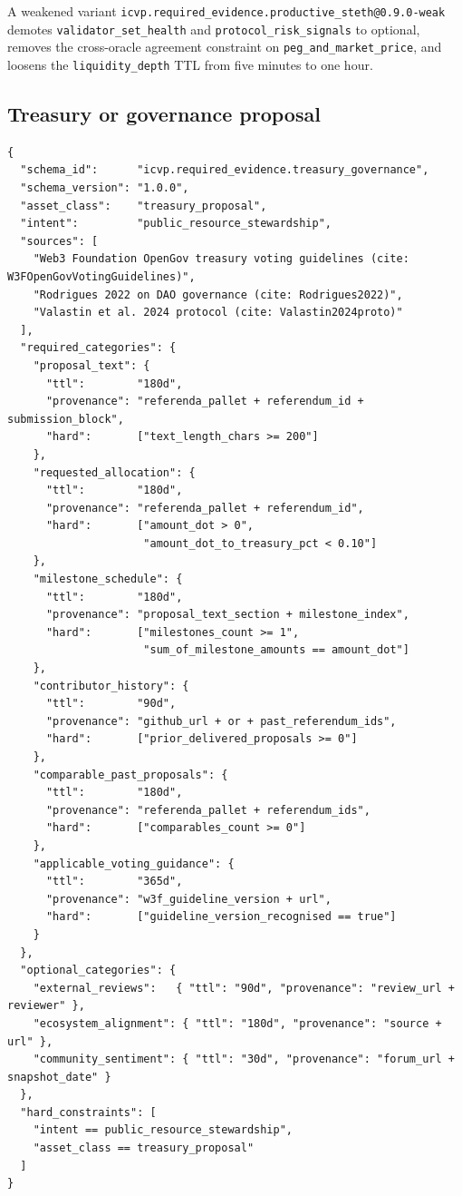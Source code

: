A weakened variant \texttt{icvp.required\_evidence.productive\_steth@0.9.0-weak} demotes \texttt{validator\_set\_health} and \texttt{protocol\_risk\_signals} to optional, removes the cross-oracle agreement constraint on \texttt{peg\_and\_market\_price}, and loosens the \texttt{liquidity\_depth} TTL from five minutes to one hour.

\subsection{Treasury or governance proposal}
\label{app:schema-treasury}

\begin{verbatim}
{
  "schema_id":      "icvp.required_evidence.treasury_governance",
  "schema_version": "1.0.0",
  "asset_class":    "treasury_proposal",
  "intent":         "public_resource_stewardship",
  "sources": [
    "Web3 Foundation OpenGov treasury voting guidelines (cite: W3FOpenGovVotingGuidelines)",
    "Rodrigues 2022 on DAO governance (cite: Rodrigues2022)",
    "Valastin et al. 2024 protocol (cite: Valastin2024proto)"
  ],
  "required_categories": {
    "proposal_text": {
      "ttl":        "180d",
      "provenance": "referenda_pallet + referendum_id + submission_block",
      "hard":       ["text_length_chars >= 200"]
    },
    "requested_allocation": {
      "ttl":        "180d",
      "provenance": "referenda_pallet + referendum_id",
      "hard":       ["amount_dot > 0",
                     "amount_dot_to_treasury_pct < 0.10"]
    },
    "milestone_schedule": {
      "ttl":        "180d",
      "provenance": "proposal_text_section + milestone_index",
      "hard":       ["milestones_count >= 1",
                     "sum_of_milestone_amounts == amount_dot"]
    },
    "contributor_history": {
      "ttl":        "90d",
      "provenance": "github_url + or + past_referendum_ids",
      "hard":       ["prior_delivered_proposals >= 0"]
    },
    "comparable_past_proposals": {
      "ttl":        "180d",
      "provenance": "referenda_pallet + referendum_ids",
      "hard":       ["comparables_count >= 0"]
    },
    "applicable_voting_guidance": {
      "ttl":        "365d",
      "provenance": "w3f_guideline_version + url",
      "hard":       ["guideline_version_recognised == true"]
    }
  },
  "optional_categories": {
    "external_reviews":   { "ttl": "90d", "provenance": "review_url + reviewer" },
    "ecosystem_alignment": { "ttl": "180d", "provenance": "source + url" },
    "community_sentiment": { "ttl": "30d", "provenance": "forum_url + snapshot_date" }
  },
  "hard_constraints": [
    "intent == public_resource_stewardship",
    "asset_class == treasury_proposal"
  ]
}
\end{verbatim}

